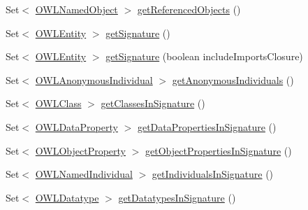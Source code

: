 \begin{DoxyCompactItemize}
Set$<$ \hyperlink{interfaceorg_1_1semanticweb_1_1owlapi_1_1model_1_1_o_w_l_named_object}{O\-W\-L\-Named\-Object} $>$ \hyperlink{classuk_1_1ac_1_1manchester_1_1cs_1_1owl_1_1owlapi_1_1_o_w_l_ontology_impl_a41cbccb4a8f5ce092f55356f2a123987}{get\-Referenced\-Objects} ()
\item 
Set$<$ \hyperlink{interfaceorg_1_1semanticweb_1_1owlapi_1_1model_1_1_o_w_l_entity}{O\-W\-L\-Entity} $>$ \hyperlink{classuk_1_1ac_1_1manchester_1_1cs_1_1owl_1_1owlapi_1_1_o_w_l_ontology_impl_acf4f6dc1a65552a6bdcc4402a1efd221}{get\-Signature} ()
\item 
Set$<$ \hyperlink{interfaceorg_1_1semanticweb_1_1owlapi_1_1model_1_1_o_w_l_entity}{O\-W\-L\-Entity} $>$ \hyperlink{classuk_1_1ac_1_1manchester_1_1cs_1_1owl_1_1owlapi_1_1_o_w_l_ontology_impl_a9bf758101e0c5d175e80c4bd032f7dfb}{get\-Signature} (boolean include\-Imports\-Closure)
\item 
Set$<$ \hyperlink{interfaceorg_1_1semanticweb_1_1owlapi_1_1model_1_1_o_w_l_anonymous_individual}{O\-W\-L\-Anonymous\-Individual} $>$ \hyperlink{classuk_1_1ac_1_1manchester_1_1cs_1_1owl_1_1owlapi_1_1_o_w_l_ontology_impl_a850caf2724552e8df70da6b448ecf43b}{get\-Anonymous\-Individuals} ()
\item 
Set$<$ \hyperlink{interfaceorg_1_1semanticweb_1_1owlapi_1_1model_1_1_o_w_l_class}{O\-W\-L\-Class} $>$ \hyperlink{classuk_1_1ac_1_1manchester_1_1cs_1_1owl_1_1owlapi_1_1_o_w_l_ontology_impl_a23c6f915fb0280a209488bbba9aa7cd7}{get\-Classes\-In\-Signature} ()
\item 
Set$<$ \hyperlink{interfaceorg_1_1semanticweb_1_1owlapi_1_1model_1_1_o_w_l_data_property}{O\-W\-L\-Data\-Property} $>$ \hyperlink{classuk_1_1ac_1_1manchester_1_1cs_1_1owl_1_1owlapi_1_1_o_w_l_ontology_impl_abd702148da4427999fa95906a016bc01}{get\-Data\-Properties\-In\-Signature} ()
\item 
Set$<$ \hyperlink{interfaceorg_1_1semanticweb_1_1owlapi_1_1model_1_1_o_w_l_object_property}{O\-W\-L\-Object\-Property} $>$ \hyperlink{classuk_1_1ac_1_1manchester_1_1cs_1_1owl_1_1owlapi_1_1_o_w_l_ontology_impl_aba140617158cd396e53ab9db936e3efb}{get\-Object\-Properties\-In\-Signature} ()
\item 
Set$<$ \hyperlink{interfaceorg_1_1semanticweb_1_1owlapi_1_1model_1_1_o_w_l_named_individual}{O\-W\-L\-Named\-Individual} $>$ \hyperlink{classuk_1_1ac_1_1manchester_1_1cs_1_1owl_1_1owlapi_1_1_o_w_l_ontology_impl_ae77046b1c8241e338236cb55fd7fc848}{get\-Individuals\-In\-Signature} ()
\item 
Set$<$ \hyperlink{interfaceorg_1_1semanticweb_1_1owlapi_1_1model_1_1_o_w_l_datatype}{O\-W\-L\-Datatype} $>$ \hyperlink{classuk_1_1ac_1_1manchester_1_1cs_1_1owl_1_1owlapi_1_1_o_w_l_ontology_impl_afc744326c0b3097fbd845e79a23039b7}{get\-Datatypes\-In\-Signature} ()

\end{DoxyCompactItemize}
